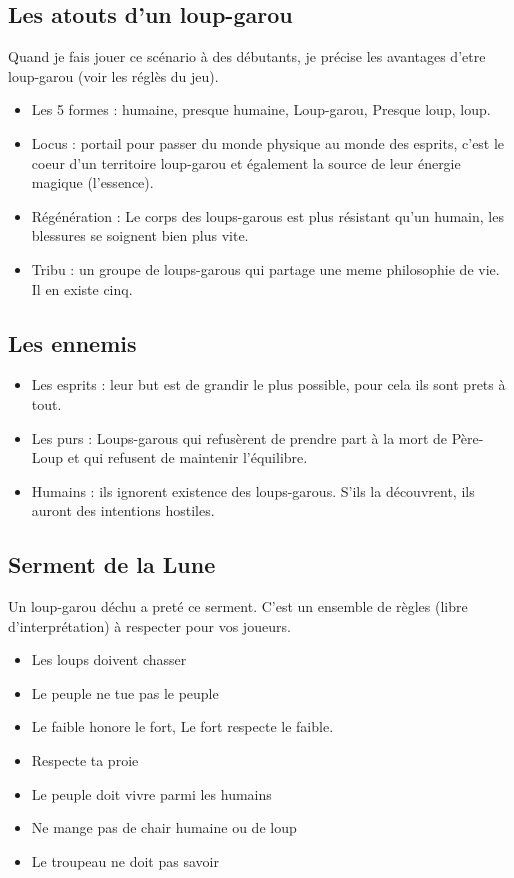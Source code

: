 \documentclass[oneside,12pt]{book}
\begin{document}
\begin{flushleft}
\subsection{Les atouts d'un loup-garou}
Quand je fais jouer ce scénario à des débutants, je précise les avantages d'etre loup-garou (voir les réglès du jeu).
\begin{itemize}
\item Les 5 formes : humaine, presque humaine, Loup-garou, Presque loup, loup.
\item Locus : portail pour passer du monde physique au monde des esprits, c'est le coeur d'un territoire loup-garou et également la source de leur énergie magique (l'essence). 
\item Régénération : Le corps des loups-garous est plus résistant qu'un humain, les blessures se soignent bien plus vite.
\item Tribu : un groupe de loups-garous qui partage une meme philosophie de vie. Il en existe cinq.
\end{itemize}

\subsection{Les ennemis}
\begin{itemize}
\item Les esprits : leur but est de grandir le plus possible, pour cela ils sont prets à tout. 
\item Les purs : Loups-garous qui refusèrent de prendre part à la mort de Père-Loup et qui refusent de maintenir l'équilibre.
\item Humains : ils ignorent existence des loups-garous. S’ils la découvrent, ils auront des intentions hostiles.
\end{itemize}


\subsection{Serment de la Lune}
Un loup-garou déchu a preté ce serment. C'est un ensemble de règles (libre d'interprétation) à respecter pour vos joueurs.
\begin{itemize}
\item Les loups doivent chasser
\item Le peuple ne tue pas le peuple
\item Le faible honore le fort, Le fort respecte le faible.
\item Respecte ta proie
\item Le peuple doit vivre parmi les humains
\item Ne mange pas de chair humaine ou de loup
\item Le troupeau ne doit pas savoir
\end{itemize}


\end{flushleft}
\end{document}
